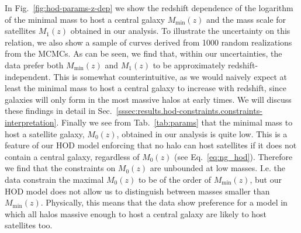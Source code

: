 \documentclass[a4paper,11pt]{article}
\begin{document}
In Fig.~\ref{fig:hod-params-z-dep} we show the redshift dependence of the logarithm of the minimal mass to host a central galaxy $M_{\mathrm{min}}(z)$ and the mass scale for satellites $M_{1}(z)$ obtained in our analysis. To illustrate the uncertainty on this relation, we also show a sample of curves derived from 1000 random realizations from the MCMCs. As can be seen, we find that, within our uncertainties, the data prefer both $M_{\mathrm{min}}(z)$ and $M_{1}(z)$ to be approximately redshift-independent. This is somewhat counterintuitive, as we would naively expect at least the minimal mass to host a central galaxy to increase with redshift, since galaxies will only form in the most massive halos at early times. We will discuss these findings in detail in Sec.~\ref{sssec:results.hod-constraints.constraints-interpretation}. Finally we see from Tab.~\ref{tab:params} that the minimal mass to host a satellite galaxy, $M_{0}(z)$, obtained in our analysis is quite low. This is a feature of our HOD model enforcing that no halo can host satellites if it does not contain a central galaxy, regardless of $M_{0}(z)$ (see Eq.~\ref{eq:ng_hod}). Therefore we find that the constraints on $M_{0}(z)$ are unbounded at low masses. I.e. the data constrain the maximal $M_{0}(z)$ to be of the order of $M_{\mathrm{min}}(z)$, but our HOD model does not allow us to distinguish between masses smaller than $M_{\mathrm{min}}(z)$. Physically, this means that the data show preference for a model in which all halos massive enough to host a central galaxy are likely to host satellites too.
\end{document}

